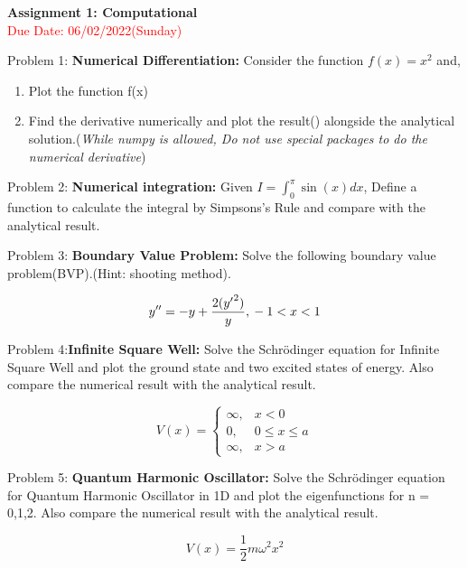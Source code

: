 \documentclass[11pt]{article}
\begin{document}
\begin{center}
	\textbf{Assignment 1: Computational} \\
\textcolor{red}{Due Date: 06/02/2022(Sunday)}
\end{center}


\begin{flushleft}
	Problem 1: \textbf{Numerical Differentiation:} Consider the function $f(x) = x^2$ and,
	\begin{enumerate}
		\item Plot the function f(x)
		\item Find the derivative numerically and plot the result() alongside the analytical solution.(\textit{While numpy is allowed, Do not use special packages to do the numerical derivative})
	\end{enumerate}
\end{flushleft}


\begin{flushleft}
	Problem 2: \textbf{Numerical integration:} Given $I  = \int_{0}^{\pi} \sin(x) dx $, Define a function to calculate the integral by Simpsons's  Rule and compare with the analytical result.
\end{flushleft}

\begin{flushleft}
	Problem 3: \textbf{Boundary Value Problem:} Solve the following boundary value problem(BVP).(Hint: shooting method). 
\end{flushleft}
\begin{equation*}
	y'' = -y + \frac{2({y'}^2)}{y}, \\ -1 < x < 1
\end{equation*}
	
	
\begin{flushleft}
	Problem 4:\textbf{Infinite Square Well:} Solve the Schr\"{o}dinger equation for Infinite Square Well and plot the ground state and two excited states of energy. Also compare the numerical result with the analytical result. 
\end{flushleft}
\begin{equation*}
	V(x)={\begin{cases}\infty,& x <0 \\ 0,& 0 \le x \le a \\\infty ,&x > a\end{cases}}
\end{equation*}

\begin{flushleft}
Problem 5: \textbf{Quantum Harmonic Oscillator:} Solve the Schr\"{o}dinger equation for Quantum Harmonic Oscillator in 1D and plot the eigenfunctions for n = 0,1,2. Also compare the numerical result with the analytical result. 
\end{flushleft}
\begin{equation*}
V(x)= \frac12 m\omega^2x^2
\end{equation*}
\end{document}
